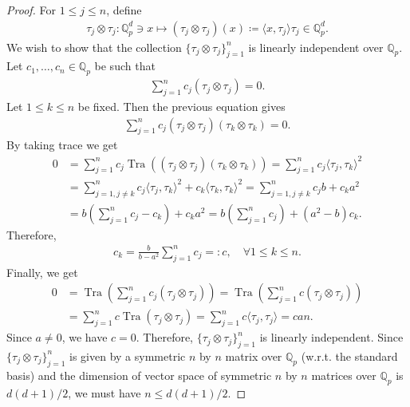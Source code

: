 \documentclass[10pt,a4paper]{amsart}
\begin{document}
\begin{proof}
	For $1\leq j \leq n$, define 
	\begin{align*}
		\tau_j \otimes \tau_j: \mathbb{Q}^d_p \ni x \mapsto(\tau_j \otimes \tau_j)(x)\coloneqq \langle x, \tau_j\rangle \tau_j \in \mathbb{Q}^d_p.
	\end{align*}
	We wish to show that the collection $\{\tau_j \otimes \tau_j\}_{j=1}^n$   is linearly independent  over  $ \mathbb{Q}_p$. Let $c_1, \dots,  c_n \in  \mathbb{Q}_p$ be such that 
	\begin{align*}
		\sum_{j=1}^{n}c_j(\tau_j \otimes \tau_j)=0.
	\end{align*}
	Let $1\leq k \leq n$ be fixed. Then the previous equation gives 
	\begin{align*}
		\sum_{j=1}^{n}c_j(\tau_j \otimes \tau_j)(\tau_k \otimes \tau_k)	=0.
	\end{align*}
	By taking trace we get
	\begin{align*}
		0&=\sum_{j=1}^{n}c_j\operatorname{Tra}((\tau_j \otimes \tau_j)(\tau_k \otimes \tau_k))=\sum_{j=1}^{n}c_j\langle \tau_j, \tau_k\rangle^2\\
		&=\sum_{j=1, j \neq k}^{n}c_j\langle \tau_j, \tau_k\rangle^2+c_k\langle \tau_k, \tau_k\rangle^2=\sum_{j=1, j \neq k}^{n}c_jb+c_ka^2\\
		&=b\left(\sum_{j=1}^{n}c_j-c_k\right)+c_ka^2=b\left(\sum_{j=1}^{n}c_j\right)+(a^2-b)c_k.
	\end{align*}
	Therefore, 
	\begin{align*}
		c_k=\frac{b}{b-a^2}\sum_{j=1}^{n}c_j=:c, \quad \forall 1\le k \leq n.	
	\end{align*}
	Finally, we get 
	\begin{align*}
		0&=\operatorname{Tra}\left(\sum_{j=1}^{n}c_j(\tau_j \otimes \tau_j)\right)=\operatorname{Tra}\left(\sum_{j=1}^{n}c(\tau_j \otimes \tau_j)\right)\\
		&=\sum_{j=1}^{n}c\operatorname{Tra}(\tau_j \otimes \tau_j)=\sum_{j=1}^{n}c\langle \tau_j, \tau_j\rangle=can.
	\end{align*}
	Since $a\neq 0$, we have $c=0$. Therefore, $\{\tau_j \otimes \tau_j\}_{j=1}^n$ is linearly independent.  Since $\{\tau_j \otimes \tau_j\}_{j=1}^n$ is given by a symmetric $n$ by $n$ matrix over $\mathbb{Q}_p$ (w.r.t. the standard basis) and the dimension of vector space of symmetric $n$ by $n$ matrices  over $\mathbb{Q}_p$ is $d(d+1)/2$,  we must have $n\leq d(d+1)/2$.
\end{proof}
\end{document}

